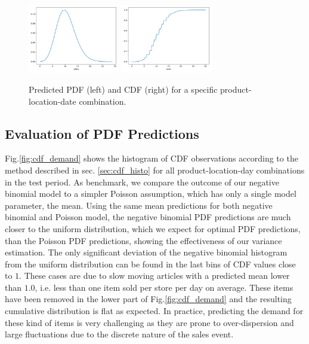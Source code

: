 \documentclass[BCOR=1mm, DIV=calc,10pt,
twoside=true,
twocolumn,
headings=normal]{scrartcl}
\newcommand{\fig}{Fig.}
\begin{document}
\begin{figure}
\begin{center}
\includegraphics[width=4cm]{../figures/pdf}
\includegraphics[width=4cm]{../figures/cdf}
\caption{\label{fig:pdf_example} Predicted PDF (left) and CDF (right) for a specific product-location-date combination.}
\end{center}
\end{figure}

\subsection{Evaluation of PDF Predictions}

\fig \ref{fig:cdf_demand} shows the histogram of CDF observations according to the method described in sec. \ref{sec:cdf_histo} for all product-location-day combinations in the test period. As benchmark, we compare the outcome of our negative binomial model to a simpler Poisson assumption, which has only a single model parameter, the mean. Using the same mean predictions for both negative binomial and Poisson model, the negative binomial PDF predictions are much closer to the uniform distribution, which we expect for optimal PDF predictions, than the Poisson PDF predictions, showing the effectiveness of our variance estimation. The only significant deviation of the negative binomial histogram from the uniform distribution can be found in the last bins of CDF values close to $1$. These cases are due to slow moving articles with a predicted mean lower than $1.0$, i.e. less than one item sold per store per day on average. These items have been removed in the lower part of  \fig \ref{fig:cdf_demand} and the resulting cumulative distribution is flat as expected. In practice, predicting the demand for these kind of items is very challenging as they are prone to over-dispersion and large fluctuations due to the discrete nature of the sales event.
\end{document}
